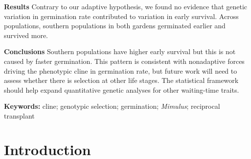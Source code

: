 \documentclass[
  12pt,
]{article}
\begin{document}
\textbf{Results} Contrary to our adaptive hypothesis, we found no evidence that genetic variation in germination rate contributed to variation in early survival. Across populations, southern populations in both gardens germinated earlier and survived more.

\textbf{Conclusions} Southern populations have higher early survival but this is not caused by faster germination. This pattern is consistent with nonadaptive forces driving the phenotypic cline in germination rate, but future work will need to assess whether there is selection at other life stages. The statistical framework should help expand quantitative genetic analyses for other waiting-time traits.

\textbf{Keywords:} cline; genotypic selection; germination; \emph{Mimulus}; reciprocal transplant

\newpage

\hypertarget{introduction}{%
\section{Introduction}\label{introduction}}
\end{document}
